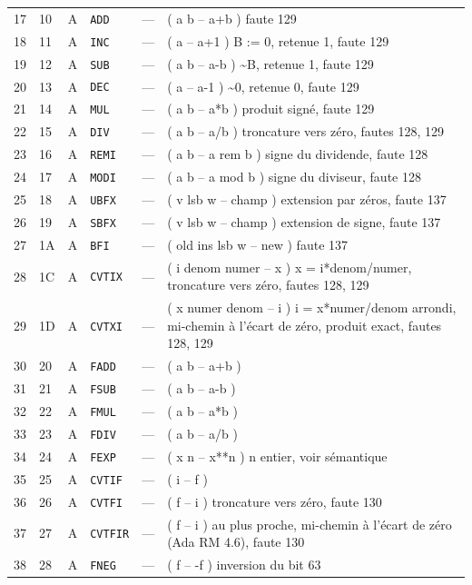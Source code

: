 \documentclass[10pt,a4paper,twoside,openany]{book}
\begin{document}
\begin{landscape}
\begin{longtable}{@{}r l c l l p{10.7cm}@{}}
17 & 10 & A & \texttt{ADD} & --- & ( a b -- a+b )	faute 129\\
18 & 11 & A & \texttt{INC} & --- & ( a -- a+1 )		B := 0, retenue 1, faute 129\\
19 & 12 & A & \texttt{SUB} & --- & ( a b -- a-b )	\textasciitilde{}B, retenue 1, faute 129\\
20 & 13 & A & \texttt{DEC} & --- & ( a -- a-1 )		\textasciitilde{}0, retenue 0, faute 129\\
21 & 14 & A & \texttt{MUL} & --- & ( a b -- a*b )	produit signé, faute 129\\
22 & 15 & A & \texttt{DIV} & --- & ( a b -- a/b )	troncature vers zéro, fautes 128, 129\\
23 & 16 & A & \texttt{REMI} & --- & ( a b -- a rem b )	signe du dividende, faute 128\\
24 & 17 & A & \texttt{MODI} & --- & ( a b -- a mod b )	signe du diviseur, faute 128\\
25 & 18 & A & \texttt{UBFX} & --- & ( v lsb w -- champ )		extension par zéros, faute 137\\
26 & 19 & A & \texttt{SBFX} & --- & ( v lsb w -- champ )		extension de signe, faute 137\\
27 & 1A & A & \texttt{BFI} & --- & ( old ins lsb w -- new )	faute 137\\
28 & 1C & A & \texttt{CVTIX} & --- & ( i denom numer -- x )	x = i*denom/numer, troncature vers zéro, fautes 128, 129\\
29 & 1D & A & \texttt{CVTXI} & --- & ( x numer denom -- i )	i = x*numer/denom arrondi, mi-chemin à l'écart de zéro, produit exact, fautes 128, 129\\
30 & 20 & A & \texttt{FADD} & --- & ( a b -- a+b )\\
31 & 21 & A & \texttt{FSUB} & --- & ( a b -- a-b )\\
32 & 22 & A & \texttt{FMUL} & --- & ( a b -- a*b )\\
33 & 23 & A & \texttt{FDIV} & --- & ( a b -- a/b )\\
34 & 24 & A & \texttt{FEXP} & --- & ( x n -- x**n )	n entier, voir sémantique\\
35 & 25 & A & \texttt{CVTIF} & --- & ( i -- f )\\
36 & 26 & A & \texttt{CVTFI} & --- & ( f -- i )		troncature vers zéro, faute 130\\
37 & 27 & A & \texttt{CVTFIR} & --- & ( f -- i )		au plus proche, mi-chemin à l'écart de zéro (Ada RM 4.6), faute 130\\
38 & 28 & A & \texttt{FNEG} & --- & ( f -- -f )		inversion du bit 63\\

\end{longtable}
\end{landscape}
\end{document}

